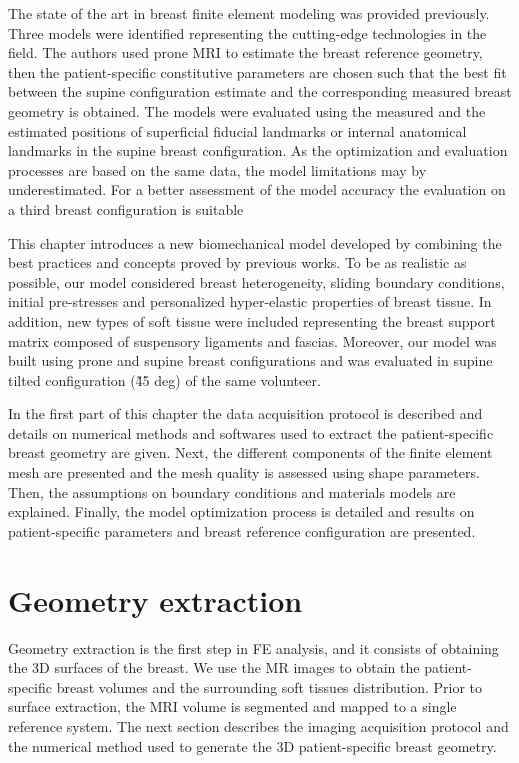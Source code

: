 
The state of the art in breast finite element modeling was provided previously. Three models were identified representing the cutting-edge technologies in the field. The authors used prone MRI to estimate the breast reference geometry, then the patient-specific constitutive parameters are chosen such that the best fit between the supine configuration estimate and the corresponding measured breast geometry is obtained. The models were evaluated using the measured and the estimated positions of superficial fiducial landmarks or internal anatomical landmarks in the supine breast configuration. As the optimization and evaluation  processes are based on the same data, the model limitations may by underestimated. For a better assessment of the model accuracy the evaluation on a third breast configuration is suitable

 This chapter introduces a new biomechanical model developed by combining the best practices and concepts proved by previous works. To be as realistic as possible, our model considered breast heterogeneity, sliding boundary conditions, initial pre-stresses and personalized hyper-elastic properties of breast tissue. In addition, new types of soft tissue were included representing the breast support matrix composed of suspensory ligaments and fascias. Moreover, our model was built using prone and supine breast configurations and was evaluated in supine tilted configuration (\~ 45 deg) of the same volunteer.

In the first part of this chapter the data acquisition protocol is described and details on numerical methods and softwares used to extract the patient-specific breast geometry are given. Next, the different components of the finite element mesh are presented and the mesh quality is assessed using shape parameters.  Then, the assumptions on boundary conditions and materials models are explained. Finally, the model optimization process is detailed and results on patient-specific parameters and breast reference configuration are presented.   
\clearpage
\section{Geometry extraction}\label{section:geometryextraction}

Geometry extraction is the first step in FE analysis, and it
consists of obtaining the 3D surfaces of the
breast. We use the MR images to obtain the patient-specific breast volumes and the surrounding soft tissues distribution. Prior to surface extraction, the MRI volume is segmented and mapped to a single reference system. The next section describes the imaging acquisition protocol and the numerical method used to generate the 3D patient-specific breast geometry.

